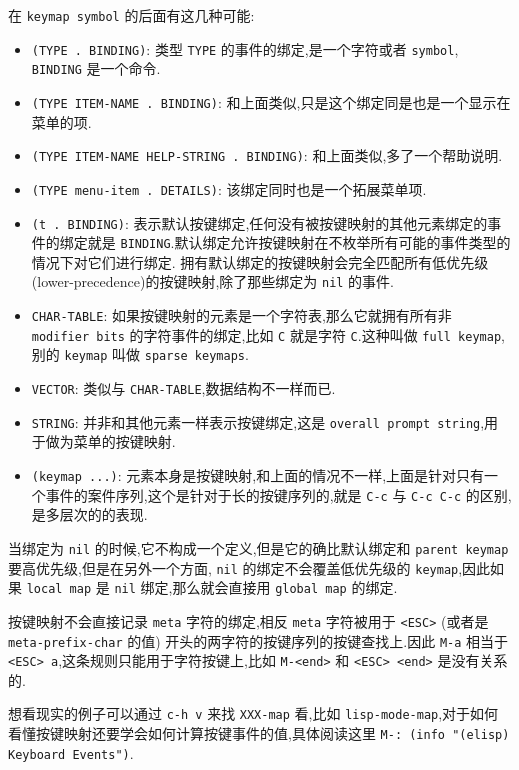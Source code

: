 \documentclass[11pt]{article}
\begin{document}
在 \texttt{keymap symbol} 的后面有这几种可能:

\begin{itemize}
\item \texttt{(TYPE . BINDING)}: 类型 \texttt{TYPE} 的事件的绑定,是一个字符或者 \texttt{symbol}, \texttt{BINDING} 是一个命令.
\item \texttt{(TYPE ITEM-NAME . BINDING)}: 和上面类似,只是这个绑定同是也是一个显示在菜单的项.
\item \texttt{(TYPE ITEM-NAME HELP-STRING . BINDING)}: 和上面类似,多了一个帮助说明.
\item \texttt{(TYPE menu-item . DETAILS)}: 该绑定同时也是一个拓展菜单项.
\item \texttt{(t . BINDING)}: 表示默认按键绑定,任何没有被按键映射的其他元素绑定的事件的绑定就是 \texttt{BINDING}.默认绑定允许按键映射在不枚举所有可能的事件类型的情况下对它们进行绑定.
拥有默认绑定的按键映射会完全匹配所有低优先级(lower-precedence)的按键映射,除了那些绑定为 \texttt{nil} 的事件.
\item \texttt{CHAR-TABLE}: 如果按键映射的元素是一个字符表,那么它就拥有所有非 \texttt{modifier bits} 的字符事件的绑定,比如 \texttt{C} 就是字符 \texttt{C}.这种叫做 \texttt{full keymap},别的 \texttt{keymap} 叫做 \texttt{sparse keymaps}.
\item \texttt{VECTOR}: 类似与 \texttt{CHAR-TABLE},数据结构不一样而已.
\item \texttt{STRING}: 并非和其他元素一样表示按键绑定,这是 \texttt{overall prompt string},用于做为菜单的按键映射.
\item \texttt{(keymap ...)}: 元素本身是按键映射,和上面的情况不一样,上面是针对只有一个事件的案件序列,这个是针对于长的按键序列的,就是 \texttt{C-c} 与 \texttt{C-c C-c} 的区别,是多层次的的表现.
\end{itemize}

当绑定为 \texttt{nil} 的时候,它不构成一个定义,但是它的确比默认绑定和 \texttt{parent keymap} 要高优先级,但是在另外一个方面, \texttt{nil} 的绑定不会覆盖低优先级的 \texttt{keymap},因此如果 \texttt{local map} 是 \texttt{nil} 绑定,那么就会直接用 \texttt{global map} 的绑定.

按键映射不会直接记录 \texttt{meta} 字符的绑定,相反 \texttt{meta} 字符被用于 \texttt{<ESC>} (或者是 \texttt{meta-prefix-char} 的值) 开头的两字符的按键序列的按键查找上.因此 \texttt{M-a} 相当于 \texttt{<ESC> a},这条规则只能用于字符按键上,比如 \texttt{M-<end>} 和 \texttt{<ESC> <end>} 是没有关系的.

想看现实的例子可以通过 \texttt{c-h v} 来找 \texttt{XXX-map} 看,比如 \texttt{lisp-mode-map},对于如何看懂按键映射还要学会如何计算按键事件的值,具体阅读这里 \texttt{M-: (info "(elisp) Keyboard Events")}.
\end{document}
